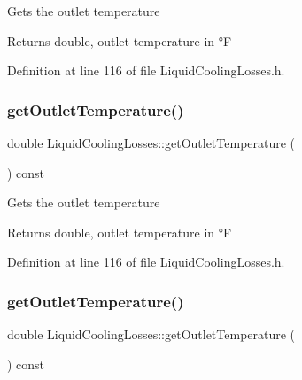Gets the outlet temperature

\begin{DoxyReturn}{Returns}
double, outlet temperature in °F 
\end{DoxyReturn}


Definition at line 116 of file Liquid\+Cooling\+Losses.\+h.

\mbox{\label{class_liquid_cooling_losses_ae6364da9b374e95dd657096350464acb}} 
\subsubsection{\texorpdfstring{get\+Outlet\+Temperature()}{getOutletTemperature()}\hspace{0.1cm}{\footnotesize\ttfamily [2/3]}}
{\footnotesize\ttfamily double Liquid\+Cooling\+Losses\+::get\+Outlet\+Temperature (\begin{DoxyParamCaption}{ }\end{DoxyParamCaption}) const\hspace{0.3cm}{\ttfamily [inline]}}

Gets the outlet temperature

\begin{DoxyReturn}{Returns}
double, outlet temperature in °F 
\end{DoxyReturn}


Definition at line 116 of file Liquid\+Cooling\+Losses.\+h.

\mbox{\label{class_liquid_cooling_losses_ae6364da9b374e95dd657096350464acb}} 
\subsubsection{\texorpdfstring{get\+Outlet\+Temperature()}{getOutletTemperature()}\hspace{0.1cm}{\footnotesize\ttfamily [3/3]}}
{\footnotesize\ttfamily double Liquid\+Cooling\+Losses\+::get\+Outlet\+Temperature (\begin{DoxyParamCaption}{ }\end{DoxyParamCaption}) const\hspace{0.3cm}{\ttfamily [inline]}}


